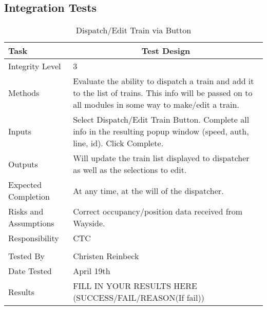 \documentclass[]{article}
\begin{document}
\subsection{Integration Tests}

 
\begin{table}[H]
	\centering
	\caption{Dispatch/Edit Train via Button}
	\begin{tabular}{|l|l|}
		\hline
		Task & \multicolumn{1}{c|}{Test Design} \\ \hline
		Integrity Level & 3 \\ \hline
		Methods & \parbox[t]{10cm}{Evaluate the ability to dispatch a train and add it to the list of trains. This info will be passed on to all modules in some way to make/edit a train.}\\ \hline
		Inputs &  \parbox[t]{10cm}{Select Dispatch/Edit Train Button. Complete all info in the resulting popup window (speed, auth, line, id). Click Complete.} \\ \hline
		Outputs &  \parbox[t]{10cm}{Will update the train list displayed to dispatcher as well as the selections to edit.} \\ \hline
		Expected Completion & At any time, at the will of the dispatcher. \\ \hline
		Risks and Assumptions & \parbox[t]{10cm}{Correct occupancy/position data received from Wayside.}  \\ \hline
		Responsibility & CTC\\ \hline
		\\ \hline
		Tested By   &  Christen Reinbeck\\	\hline
		Date Tested & \parbox[t]{10cm}{April 19th}\\ \hline
		Results & FILL IN YOUR RESULTS HERE (SUCCESS/FAIL/REASON(If fail))\\ \hline
	\end{tabular}
\end{table}
\end{document}
